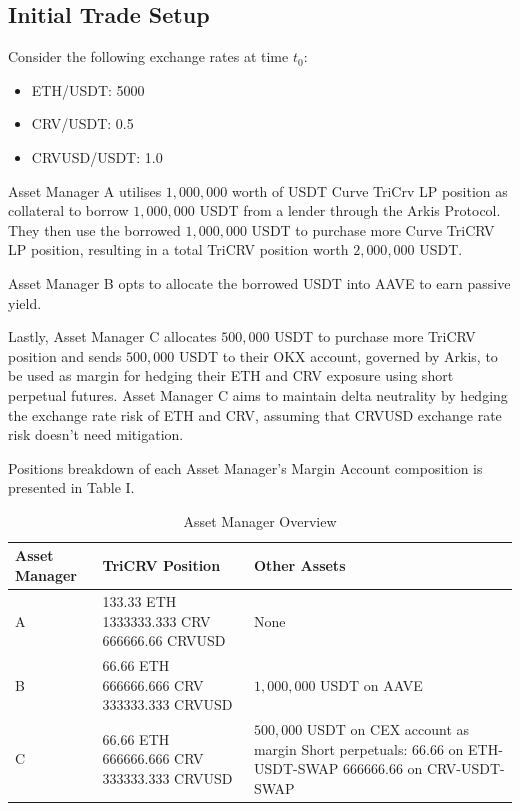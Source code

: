 \documentclass[conference]{IEEEtran}
\begin{document}
\clearpage

\subsection{Initial Trade Setup}
Consider the following exchange rates at time $t_{0}$:
\begin{itemize}
	\item ETH/USDT: 5000
	\item CRV/USDT: 0.5
	\item CRVUSD/USDT: 1.0
\end{itemize}

Asset Manager A utilises $1,000,000$ worth of USDT Curve TriCrv LP position as collateral to borrow $1,000,000$ USDT from a lender through the Arkis Protocol. They then use the borrowed $1,000,000$ USDT to purchase more Curve TriCRV LP position, resulting in a total TriCRV position worth $2,000,000$ USDT.

Asset Manager B opts to allocate the borrowed USDT into AAVE to earn passive yield. 

Lastly, Asset Manager C allocates $500,000$ USDT to purchase more TriCRV position and sends $500,000$ USDT to their OKX account, governed by Arkis, to be used as margin for hedging their ETH and CRV exposure using short perpetual futures. Asset Manager C aims to maintain delta neutrality by hedging the exchange rate risk of ETH and CRV, assuming that CRVUSD exchange rate risk doesn’t need mitigation.

Positions breakdown of each Asset Manager's Margin Account composition is presented in Table I.


\begin{table}[h]
\centering
\begin{tabular}{|p{1.5cm}|p{4.5cm}|p{8cm}|}
\hline
\textbf{Asset Manager} & \textbf{TriCRV Position} & \textbf{Other Assets} \\
\hline
A & 
\textbullet{} 133.33 ETH \newline
\textbullet{} 1333333.333 CRV \newline
\textbullet{} 666666.66 CRVUSD
& None \\
\hline
B & 
\textbullet{} 66.66 ETH \newline
\textbullet{} 666666.666 CRV \newline
\textbullet{} 333333.333 CRVUSD
& $1,000,000$ USDT on AAVE \\
\hline
C & 
\textbullet{} 66.66 ETH \newline
\textbullet{} 666666.666 CRV \newline
\textbullet{} 333333.333 CRVUSD
& \textbullet{} $500,000$ USDT on CEX account as margin \newline
\textbullet{} Short perpetuals: \newline
  \quad{} \textbullet{} 66.66 on ETH-USDT-SWAP \newline
  \quad{} \textbullet{} 666666.66 on CRV-USDT-SWAP \\
\hline
\end{tabular}
\caption{Asset Manager Overview}
\label{tab:asset-manager-overview}
\end{table}
\end{document}
